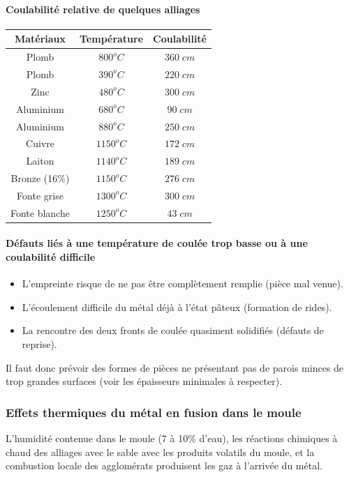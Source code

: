 \documentclass[11pt,oneside]{article}
\begin{document}
\paragraph*{Coulabilité relative de quelques alliages}
\begin{center}
 \begin{tabular}{ccc}
  \hline
    Matériaux & Température & Coulabilité \\
\hline
Plomb         & $800^oC$  & $360\;cm$ \\
Plomb         & $390^oC$  & $220\;cm$ \\
Zinc          & $480^oC$  & $300\;cm$ \\
Aluminium     & $680^oC$  & $ 90\;cm$ \\
Aluminium     & $880^oC$  & $250\;cm$ \\
Cuivre        & $1150^oC$ & $172\;cm$ \\
Laiton        & $1140^oC$ & $189\;cm$ \\
Bronze (16\%) & $1150^oC$ & $276\;cm$ \\
Fonte grise   & $1300^oC$ & $300\;cm$ \\
Fonte blanche & $1250^oC$ & $ 43\;cm$ \\
\hline
 \end{tabular}
\end{center}

\paragraph*{Défauts liés à une température de coulée trop basse ou à une
coulabilité difficile}
\begin{itemize}
 \item L'empreinte risque de ne pas être complètement remplie (pièce mal venue).
\item L'écoulement difficile du métal déjà à l'état pâteux (formation de rides).
\item La rencontre des deux fronts de coulée quasiment solidifiés (défauts de
reprise).
\end{itemize}

Il faut donc prévoir des formes de pièces ne présentant pas de parois minces de
trop grandes surfaces (voir les épaisseurs minimales à respecter).

\subsubsection{Effets thermiques du métal en fusion dans le moule}
L'humidité contenue dans le moule (7 à 10\%  d'eau), les réactions chimiques à
chaud des alliages avec le sable avec les produits volatils du moule, et la
combustion locale des agglomérats produisent les gaz à l'arrivée du métal. 
\end{document}

